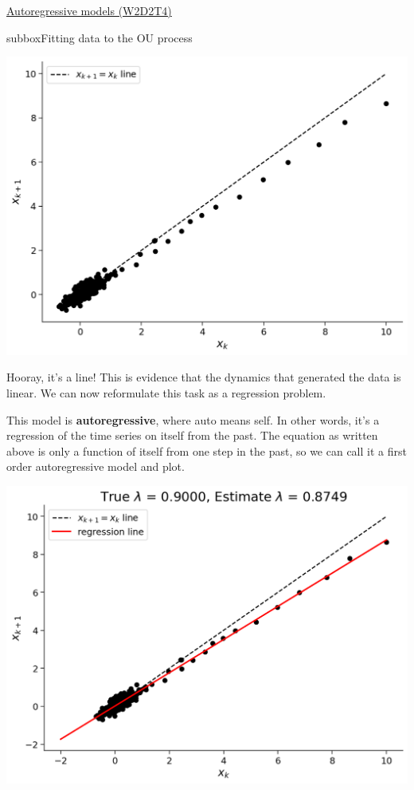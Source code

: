 \begin{textbox}{\href{https://compneuro.neuromatch.io/tutorials/W2D2_LinearSystems/student/W2D2_Tutorial4.html}{Autoregressive models (W2D2T4)} }
\begin{subbox}{subbox}{Fitting data to the OU process}
\begin{center}
\includegraphics[scale=0.16]{Figures/LS/CDS_Figure9.png}
\end{center}


Hooray, it's a line! This is evidence that the dynamics that generated the data is linear. We can now reformulate this task as a regression problem.

This model is \textbf{autoregressive}, where auto means self. In other words, it's a regression of the time series on itself from the past. The equation as written above is only a function of itself from one step in the past, so we can call it a first order autoregressive model and plot.
\begin{center}
\includegraphics[scale=0.16]{Figures/LS/CDS_Figure10.png}
\end{center}

\end{subbox}

\end{textbox}
